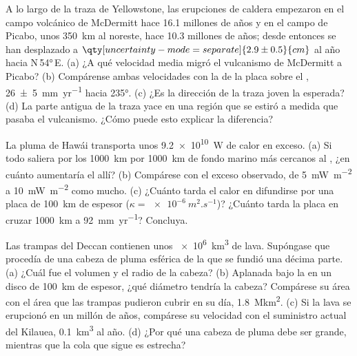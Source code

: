 \begin{exercise}[$\star\star$]\label{exo:b1:hotspots:8}
A lo largo de la traza de Yellowstone, las erupciones de caldera empezaron en el campo volcánico de McDermitt hace 16.1 millones de años y en el campo de Picabo,
unos \qty{350}{km} al noreste, hace 10.3 millones de años; desde entonces se han desplazado a $\qty[uncertainty-mode=separate]{2.9 \pm 0.5}{cm}$ al año hacia
N\,\ang{54}\,E. (a) ¿A qué velocidad media migró el vulcanismo de McDermitt a Picabo? (b) Compárense ambas velocidades con la de la placa sobre el ,
\qty[uncertainty-mode=separate]{26 \pm 5}{mm.yr^{-1}} hacia \ang{235}. (c) ¿Es la dirección de la traza joven la esperada? (d) La parte antigua de la traza yace en
una región que se estiró a medida que pasaba el vulcanismo. ¿Cómo puede esto explicar la diferencia?
\end{exercise}

\begin{exercise}[$\star\star$]\label{exo:b1:hotspots:9}
La pluma de Hawái transporta unos \qty{9.2e10}{W} de calor en exceso. (a) Si todo saliera por los \qty{1000}{km} por \qty{1000}{km} de fondo marino más
cercanos al , ¿en cuánto aumentaría el  allí? (b) Compárese con el exceso observado, de \qty{5}{mW.m^{-2}} a
\qty{10}{mW.m^{-2}} como mucho. (c) ¿Cuánto tarda el calor en difundirse por una placa de \qty{100}{km} de espesor ($\kappa = \qty{e-6}{m^2.s^{-1}}$)? ¿Cuánto
tarda la placa en cruzar \qty{1000}{km} a \qty{92}{mm.yr^{-1}}? Concluya.
\end{exercise}

\begin{exercise}[$\star\star\star$]\label{exo:b1:hotspots:10}
Las trampas del Deccan contienen unos \qty{e6}{km^3} de lava. Supóngase que procedía de una cabeza de pluma esférica de la que se fundió una décima
parte. (a) ¿Cuál fue el volumen y el radio de la cabeza? (b) Aplanada bajo la  en un disco de \qty{100}{km} de espesor, ¿qué diámetro tendría
la cabeza? Compárese su área con el área que las trampas pudieron cubrir en su día, \qty{1.8}{\mega km^2}. (c) Si la lava se erupcionó en un millón de
años, compárese su velocidad con el suministro actual del Kilauea, \qty{0.1}{km^3} al año. (d) ¿Por qué una cabeza de pluma debe ser grande, mientras que
la cola que sigue es estrecha?
\end{exercise}

